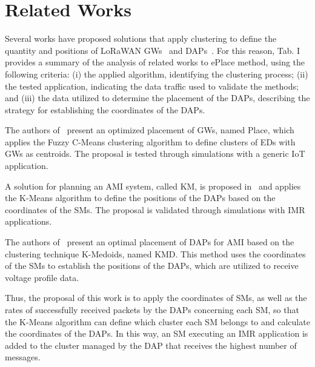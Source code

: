 \documentclass[a4paper,fleqn]{cas-dc}
\begin{document}
\section{Related Works} \label{sec:works}

Several works have proposed solutions that apply clustering to define the quantity and positions of \gls{LoRaWAN} \gls{GWs}~\cite{matni2020lorawan, neriPerformance2022} and \gls{DAPs}~\cite{piechowiak2023lorawan, gallardo2021clustering}. For this reason, Tab. I provides a summary of the analysis of related works to ePlace method, using the following criteria: (i) the applied algorithm, identifying the clustering process; (ii) the tested application, indicating the data traffic used to validate the methods; and (iii) the data utilized to determine the placement of the DAPs, describing the strategy for establishing the coordinates of the \gls{DAPs}.

The authors of~\cite{matni2020lorawan} present an optimized placement of \gls{GWs}, named Place, which applies the Fuzzy C-Means clustering algorithm to define clusters of \gls{EDs} with \gls{GWs} as centroids. The proposal is tested through simulations with a generic IoT application.

A solution for planning an \gls{AMI} system, called KM, is proposed in~\cite{piechowiak2023lorawan} and applies the K-Means algorithm to define the positions of the \gls{DAPs} based on the coordinates of the SMs. The proposal is validated through simulations with IMR applications. 

The authors of~\cite{gallardo2021clustering} present an optimal placement of \gls{DAPs} for \gls{AMI} based on the clustering technique K-Medoids, named KMD. This method uses the coordinates of the \gls{SMs} to establish the positions of the \gls{DAPs}, which are utilized to receive voltage profile data.

Thus, the proposal of this work is to apply the coordinates of \gls{SMs}, as well as the rates of successfully received packets by the \gls{DAPs} concerning each SM, so that the K-Means algorithm can define which cluster each SM belongs to and calculate the coordinates of the \gls{DAPs}. In this way, an SM executing an IMR application is added to the cluster managed by the DAP that receives the highest number of messages.
\end{document}
